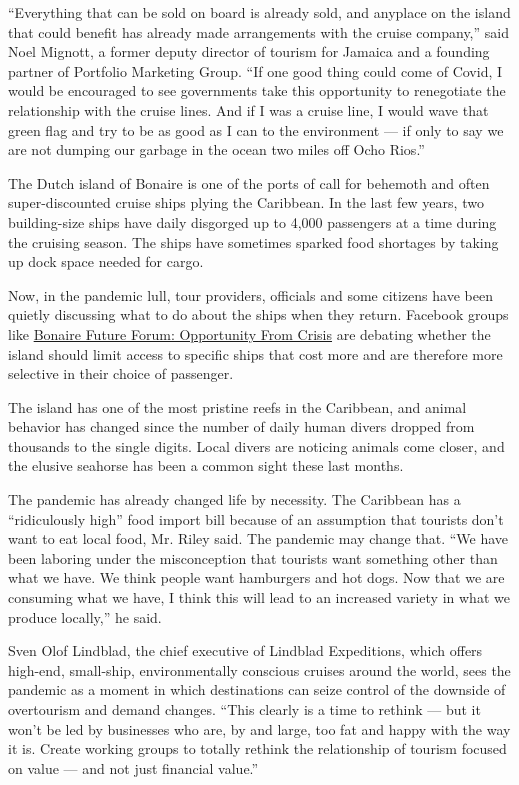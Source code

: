 ``Everything that can be sold on board is already sold, and anyplace on
the island that could benefit has already made arrangements with the
cruise company,'' said Noel Mignott, a former deputy director of tourism
for Jamaica and a founding partner of Portfolio Marketing Group. ``If
one good thing could come of Covid, I would be encouraged to see
governments take this opportunity to renegotiate the relationship with
the cruise lines. And if I was a cruise line, I would wave that green
flag and try to be as good as I can to the environment --- if only to
say we are not dumping our garbage in the ocean two miles off Ocho
Rios.''

The Dutch island of Bonaire is one of the ports of call for behemoth and
often super-discounted cruise ships plying the Caribbean. In the last
few years, two building-size ships have daily disgorged up to 4,000
passengers at a time during the cruising season. The ships have
sometimes sparked food shortages by taking up dock space needed for
cargo.

Now, in the pandemic lull, tour providers, officials and some citizens
have been quietly discussing what to do about the ships when they
return. Facebook groups like
\href{https://www.facebookcorewwwi.onion/groups/BonaireFutureForum/}{Bonaire
Future Forum: Opportunity From Crisis} are debating whether the island
should limit access to specific ships that cost more and are therefore
more selective in their choice of passenger.

The island has one of the most pristine reefs in the Caribbean, and
animal behavior has changed since the number of daily human divers
dropped from thousands to the single digits. Local divers are noticing
animals come closer, and the elusive seahorse has been a common sight
these last months.

The pandemic has already changed life by necessity. The Caribbean has a
``ridiculously high'' food import bill because of an assumption that
tourists don't want to eat local food, Mr. Riley said. The pandemic may
change that. ``We have been laboring under the misconception that
tourists want something other than what we have. We think people want
hamburgers and hot dogs. Now that we are consuming what we have, I think
this will lead to an increased variety in what we produce locally,'' he
said.

Sven Olof Lindblad, the chief executive of Lindblad Expeditions, which
offers high-end, small-ship, environmentally conscious cruises around
the world, sees the pandemic as a moment in which destinations can seize
control of the downside of overtourism and demand changes. ``This
clearly is a time to rethink --- but it won't be led by businesses who
are, by and large, too fat and happy with the way it is. Create working
groups to totally rethink the relationship of tourism focused on value
--- and not just financial value.''

